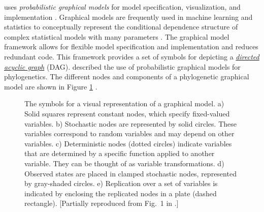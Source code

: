 \RevBayes uses \textit{probabilistic graphical models} for model specification, visualization, and implementation \citep{Hoehna2014b}. 
Graphical models are frequently used in machine learning and statistics to conceptually represent the conditional dependence structure of complex statistical models with many parameters \citep{Gilks1994,Lunn2000,Jordan2004,Koller2009,Lunn2009}. 
The graphical model framework allows for flexible model specification and implementation and reduces redundant code. 
This framework provides a set of symbols for depicting a \href{http://en.wikipedia.org/wiki/Directed_acyclic_graph}{\textit{directed acyclic graph}} (DAG). 
\citet{Hoehna2014b} described the use of probabilistic graphical models for phylogenetics. 
The different nodes and components of a phylogenetic graphical model are shown in Figure \ref{gmnotation} \citep[Fig. 1 from][]{Hoehna2014b}. 
\begin{figure}[h!]
\centering
{}
\caption{\small The symbols for a visual representation of a graphical model. 
a) Solid squares represent constant nodes, which specify fixed-valued variables. 
b) Stochastic nodes are represented by solid circles. 
These variables correspond to random variables and may depend on other variables. 
c) Deterministic nodes (dotted circles) indicate variables that are determined by a specific function applied to another variable. 
They can be thought of as variable transformations. 
d) Observed states are placed in clamped stochastic nodes, represented by gray-shaded circles. e) Replication over a set of variables is indicated by enclosing the replicated nodes in a plate (dashed rectangle). 
[Partially reproduced from Fig.~1 in \citet{Hoehna2014b}.]
}
\label{gmnotation}
\end{figure}

